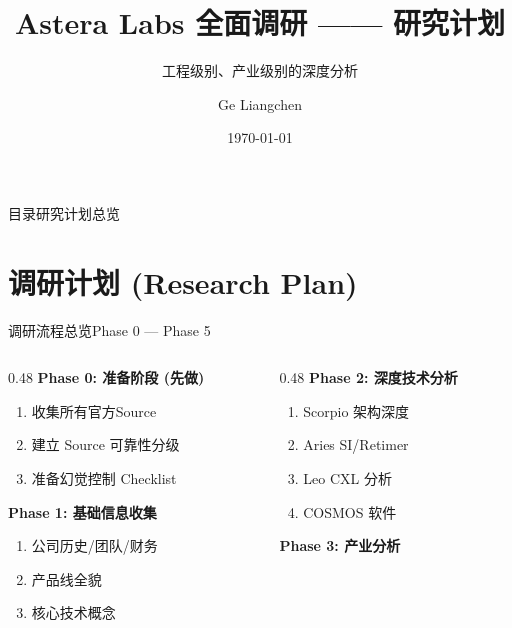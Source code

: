 \documentclass[UTF8,11pt,aspectratio=169]{beamer}
\title[Astera Labs 调研计划]{Astera Labs 全面调研 —— 研究计划}
\subtitle{工程级别、产业级别的深度分析}
\author[Ge Liangchen]{Ge Liangchen}
\date{\today}
\institute{半导体行业分析}
\begin{document}
\begin{frame}
    \titlepage
\end{frame}

\begin{frame}{目录}{研究计划总览}
    \tableofcontents
\end{frame}

\section{调研计划 (Research Plan)}

\begin{frame}{调研流程总览}{Phase 0 — Phase 5}
    \begin{columns}[T]
        \begin{column}{0.48\textwidth}
            \textbf{Phase 0: 准备阶段 (先做)}
            \begin{enumerate}
                \item 收集所有官方Source
                \item 建立 Source 可靠性分级
                \item 准备幻觉控制 Checklist
            \end{enumerate}
            \vspace{0.3cm}
            \textbf{Phase 1: 基础信息收集}
            \begin{enumerate}
                \item 公司历史/团队/财务
                \item 产品线全貌
                \item 核心技术概念
            \end{enumerate}
        \end{column}
        \begin{column}{0.48\textwidth}
            \textbf{Phase 2: 深度技术分析}
            \begin{enumerate}
                \item Scorpio 架构深度
                \item Aries SI/Retimer
                \item Leo CXL 分析
                \item COSMOS 软件
            \end{enumerate}
            \vspace{0.3cm}
            \textbf{Phase 3: 产业分析}

\end{column}
\end{columns}
\end{frame}
\end{document}
